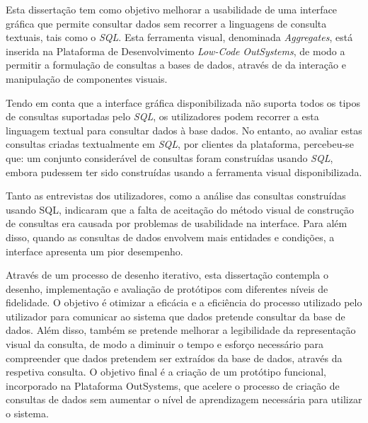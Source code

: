 Esta dissertação tem como objetivo melhorar a usabilidade de uma interface gráfica que permite consultar dados sem recorrer a linguagens de consulta textuais, tais como o \textit{SQL}. Esta ferramenta visual, denominada \textit{Aggregates}, está inserida na Plataforma de Desenvolvimento \textit{Low-Code} \textit{OutSystems}, de modo a permitir a formulação de consultas a bases de dados, através de da interação e manipulação de componentes visuais.

Tendo em conta que a interface gráfica disponibilizada não suporta todos os tipos de consultas suportadas pelo \textit{SQL}, os utilizadores podem recorrer a esta linguagem textual para consultar dados à base dados. No entanto, ao avaliar estas consultas criadas textualmente em \textit{SQL}, por clientes da plataforma, percebeu-se que: um conjunto considerável de consultas foram construídas usando \textit{SQL}, embora pudessem ter sido construídas usando a ferramenta visual disponibilizada.

Tanto as entrevistas dos utilizadores, como a análise das consultas construídas usando SQL, indicaram que a falta de aceitação do método visual de construção de consultas era causada por problemas de usabilidade na interface. Para além disso, quando as consultas de dados envolvem mais entidades e condições, a interface apresenta um pior desempenho.

Através de um processo de desenho iterativo, esta dissertação contempla o desenho, implementação e avaliação de protótipos com diferentes níveis de fidelidade. O objetivo é otimizar a eficácia e a eficiência do processo utilizado pelo utilizador para comunicar ao sistema que dados pretende consultar da base de dados. Além disso, também se pretende melhorar a legibilidade da representação visual da consulta, de modo a diminuir o tempo e esforço necessário para compreender que dados pretendem ser extraídos da base de dados, através da respetiva consulta. O objetivo final é a criação de um protótipo funcional, incorporado na Plataforma OutSystems, que acelere o processo de criação de consultas de dados sem aumentar o nível de aprendizagem necessária para utilizar o sistema.


